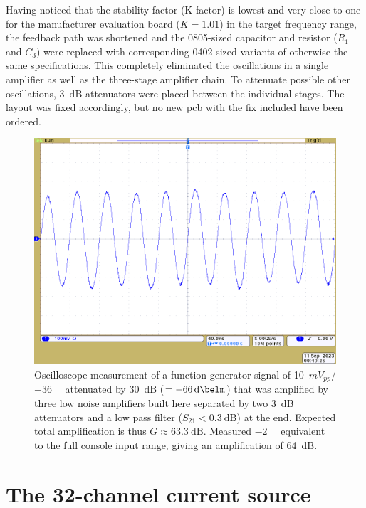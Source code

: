 Having noticed that the stability factor (K-factor) is lowest and very close to one for the manufacturer evaluation board (\(K = 1.01\)) in the target frequency range, the feedback path was shortened and the 0805-sized capacitor and resistor (\(R_1\) and \(C_3\)) were replaced with corresponding 0402-sized variants of otherwise the same specifications. This completely eliminated the oscillations in a single amplifier as well as the three-stage amplifier chain. To attenuate possible other oscillations, \qty{3}{\deci\bel} attenuators were placed between the individual stages. The layout was fixed accordingly, but no new \acrshort{pcb} with the fix included have been ordered.

\begin{figure}[hbt]
    \centering
    \includegraphics[width=\textwidth]{images/preamp-10mVpp_30dB_attenuation_3_lna_2x3dB_attenuation_27MHz_lowpass_4_protection_diodes.png}
    \caption{ Oscilloscope measurement of a function generator signal of \qty{10}{\(mV_{pp}\)}/\qty{-36}{\deci\belm} attenuated by \qty{30}{\deci\bel} (\(= \qty{-66}{\deci\belm}\)) that was amplified by three low noise amplifiers built here separated by two \qty{3}{\deci\bel} attenuators and a low pass filter (\(S_{21} < \qty{0.3}{\deci\bel}\)) at the end. Expected total amplification is thus \(G \approx \qty{63.3}{\deci\bel}\). Measured \qty{-2}{\deci\belm} equivalent to the full console input range, giving an amplification of \qty{64}{\deci\bel}.}
\end{figure}

\section{The 32-channel current source}

